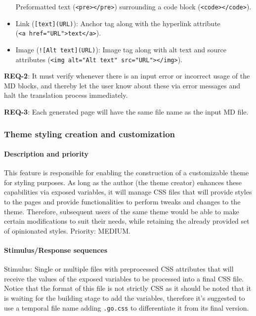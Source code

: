 \begin{itemize}
    Preformatted text
    (\texttt{\textless{}pre\textgreater{}\textless{}/pre\textgreater{}})
    surrounding a code block
    (\texttt{\textless{}code\textgreater{}\textless{}/code\textgreater{}}).
    \item
    Link (\texttt{{[}text{]}(URL)}): Anchor tag along with the hyperlink
    attribute
    (\texttt{\textless{}a\ href="URL"\textgreater{}text\textless{}/a\textgreater{}}).
    \item
    Image (\texttt{!{[}Alt\ text{]}(URL)}): Image tag along with alt text
    and source attributes
    (\texttt{\textless{}img\ alt="Alt\ text"\ src="URL"\textgreater{}\textless{}/img\textgreater{}}).
\end{itemize}

\textbf{REQ-2}: It must verify whenever there is an input error or
incorrect usage of the MD blocks, and thereby let the user know about
these via error messages and halt the translation process immediately.

\textbf{REQ-3}: Each generated page will have the same file name as the
input MD file.

\subsubsection{Theme styling creation and
customization}\label{subsubsec:theme-styling-creation-and-customization}

\paragraph{Description and
priority}\label{par:description-and-priority-1}

This feature is responsible for enabling the construction of a
customizable theme for styling purposes. As long as the author (the
theme creator) enhances these capabilities via exposed variables, it
will manage CSS files that will provide styles to the pages and provide
functionalities to perform tweaks and changes to the theme. Therefore,
subsequent users of the same theme would be able to make certain
modifications to suit their needs, while retaining the already provided
set of opinionated styles. Priority: MEDIUM.

\paragraph{Stimulus/Response
sequences}\label{par:stimulusresponse-sequences-1}

Stimulus: Single or multiple files with preprocessed CSS attributes that
will receive the values of the exposed variables to be processed into a
final CSS file. Notice that the format of this file is not strictly CSS
as it should be noted that it is waiting for the building stage to add
the variables, therefore it's suggested to use a temporal file name
adding \texttt{.go.css} to differentiate it from its final version.

